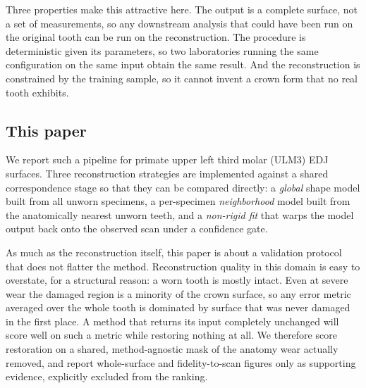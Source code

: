 \documentclass[10pt,a4paper,twocolumn]{article}
\begin{document}
Three properties make this attractive here. The output is a complete surface, not
a set of measurements, so any downstream analysis that could have been run on the
original tooth can be run on the reconstruction. The procedure is deterministic
given its parameters, so two laboratories running the same configuration on the
same input obtain the same result. And the reconstruction is constrained by the
training sample, so it cannot invent a crown form that no real tooth exhibits.

\subsection{This paper}

We report such a pipeline for primate upper left third molar (ULM3) EDJ surfaces.
Three reconstruction strategies are implemented against a shared correspondence
stage so that they can be compared directly: a \emph{global} shape model built
from all unworn specimens, a per-specimen \emph{neighborhood} model built from
the anatomically nearest unworn teeth, and a \emph{non-rigid fit} that warps the
model output back onto the observed scan under a confidence gate.

As much as the reconstruction itself, this paper is about a validation protocol
that does not flatter the method. Reconstruction quality in this domain is easy
to overstate, for a structural reason: a worn tooth is mostly intact. Even at
severe wear the damaged region is a minority of the crown surface, so any error
metric averaged over the whole tooth is dominated by surface that was never
damaged in the first place. A method that returns its input completely unchanged
will score well on such a metric while restoring nothing at all. We therefore
score restoration on a shared, method-agnostic mask of the anatomy wear actually
removed, and report whole-surface and fidelity-to-scan figures only as supporting
evidence, explicitly excluded from the ranking.
\end{document}

